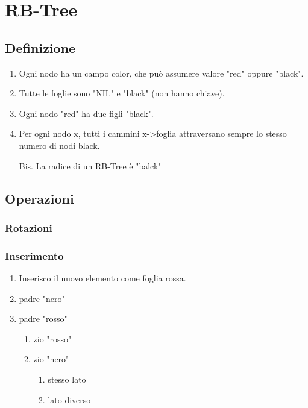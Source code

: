 
\chapter{RB-Tree}

\section{Definizione}

\begin{enumerate}

	\item Ogni nodo ha un campo color, che può assumere valore "red" oppure "black".
	\item Tutte le foglie sono "NIL" e "black" (non hanno chiave).
	\item Ogni nodo "red" ha due figli "black".
	\item Per ogni nodo x, tutti i cammini x->foglia attraversano sempre lo stesso numero di nodi black.
	\item[Bis.] La radice di un RB-Tree è "balck"

\end{enumerate}

\section{Operazioni}
\subsection{Rotazioni}
\subsection{Inserimento}

\begin{enumerate}
	\item Inserisco il nuovo elemento come foglia rossa.
	
	\item padre "nero"
	\item padre "rosso"
	\begin{enumerate}
		\item zio "rosso"
		\item zio "nero"
		\begin{enumerate}
			\item stesso lato
			\item lato diverso
		\end{enumerate}
	\end{enumerate}
\end{enumerate}

